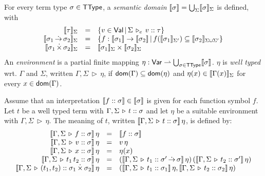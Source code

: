 \documentclass[12pt,a4paper]{article}
\newcommand{\TType}{\sstyle{TType}}
\begin{document}
\begin{definition}
  For every term type $\sigma\in\TType$, a {\em semantic domain}
  $\llbracket\sigma\rrbracket = \bigcup_{\Sigma}\llbracket\sigma\rrbracket_{\Sigma}$ is defined,
  with
  \[\begin{array}{rcl}
    \llbracket\tau\rrbracket_\Sigma
    &=& \{v\in\mathsf{Val}\,|\,\Sigma\,\triangleright_e\,v\mathrel{::}\tau\} \\
    \llbracket\sigma_1\operatorname{\dot{\to}}\sigma_2\rrbracket_\Sigma
    &=& \{f:\llbracket\sigma_1\rrbracket \to \llbracket\sigma_2\rrbracket\,|\,
    f(\llbracket\sigma_1\rrbracket_{\Sigma'}) \subseteq \llbracket\sigma_2\rrbracket_{\Sigma \cup \Sigma'}\} \\
    \llbracket\sigma_1 \operatorname{\dot{\times}} \sigma_2\rrbracket_\Sigma
    &=& \llbracket\sigma_1\rrbracket_\Sigma \times \llbracket\sigma_2\rrbracket_\Sigma
  \end{array}\]
  An {\em environment} is a partial finite mapping $\eta:\Var \pto \bigcup_{\sigma\in\TType}\semantic{\sigma}$.
  $\eta$ is {\em well typed} wrt. $\Gamma$ and $\Sigma$, written $\Gamma,\Sigma\,\triangleright\,\eta$, if
  $\mathsf{dom}(\Gamma) \subseteq \mathsf{dom}(\eta)$ and $\eta(x) \in \llbracket\Gamma(x)\rrbracket_\Sigma$ for every $x \in \mathsf{dom}(\Gamma)$.
\end{definition}

\begin{definition}
  Assume that an interpretation $\llbracket{f}\mathrel{::}{\sigma}\rrbracket \in \llbracket\sigma\rrbracket$ is given for each
  function symbol $f$.
  Let $t$ be a well typed term with $\Gamma,\Sigma\,\triangleright\,t\mathrel{::}\sigma$ and let $\eta$ be a suitable environment
  with $\Gamma,\Sigma\,\triangleright\,\eta$. The meaning of $t$, written
  $\llbracket\Gamma,\Sigma\,\triangleright\,t\mathrel{::}\sigma\rrbracket\,\eta$, is defined by:
  \[\begin{array}{rcl}
    \llbracket\Gamma,\Sigma\,\triangleright\,f\mathrel{::}\sigma\rrbracket\,\eta
    &=& \llbracket{f}\mathrel{::}{\sigma}\rrbracket \\
    \llbracket\Gamma,\Sigma\,\triangleright\,v\mathrel{::}\sigma\rrbracket\,\eta
    &=& v\,\eta \\
    \llbracket\Gamma,\Sigma\,\triangleright\,x\mathrel{::}\sigma\rrbracket\,\eta
    &=& \eta(x) \\
    \llbracket\Gamma,\Sigma\,\triangleright\,t_1\,t_2\mathrel{::}\sigma\rrbracket\,\eta
    &=& (\llbracket\Gamma,\Sigma\,\triangleright\,t_1\mathrel{::}\sigma'\operatorname{\dot{\to}}\sigma\rrbracket\,\eta)\,(\llbracket\Gamma,\Sigma\,\triangleright\,t_2\mathrel{::}\sigma'\rrbracket\,\eta) \\
    \llbracket\Gamma,\Sigma\,\triangleright\,(t_1,t_2)\mathrel{::}\sigma_1 \operatorname{\dot{\times}} \sigma_2\rrbracket\,\eta
    &=& (\llbracket\Gamma,\Sigma\,\triangleright\,t_1\mathrel{::}\sigma_1\rrbracket\,\eta,\llbracket\Gamma,\Sigma\,\triangleright\,t_2\mathrel{::}\sigma_2\rrbracket\,\eta)
  \end{array}\]
\end{definition}
\end{document}
